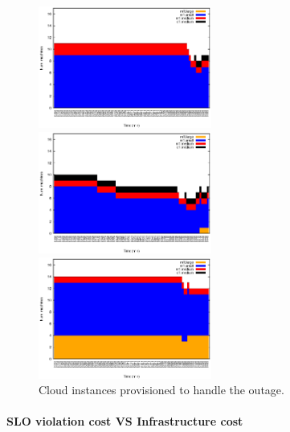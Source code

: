 \begin{figure}[htb]
	\begin{minipage}[b]{0.32\linewidth}
		\includegraphics[height=4cm]{images/exps2011/low/ec2/inst_type_machines_filtered.eps}	
		\vspace{-4mm}
	\end{minipage}
	\hfill
	\begin{minipage}[b]{0.32\linewidth}
		\includegraphics[height=4cm]{images/exps2011/medium/ec2/inst_type_machines_filtered.eps}
		\vspace{-4mm}
	\end{minipage}
\hfill
\begin{minipage}[b]{0.32\linewidth}
		\includegraphics[height=4cm]{images/exps2011/high/ec2/inst_type_machines_filtered.eps}
		\vspace{-4mm}
	\end{minipage}
\caption{Cloud instances provisioned to handle the outage.}
\label{fig:EC2Instances}
\end{figure}

\paragraph{SLO violation cost VS Infrastructure cost}

